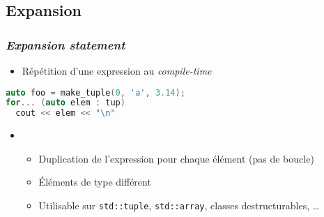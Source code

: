 \documentclass[C++.tex]{subfiles}
\begin{document}
\subsection*{Expansion}
\begin{frame}[fragile]
	\frametitle{\textit{Expansion statement}}
	\begin{itemize}
		\item Répétition d'une expression au \textit{compile-time}
	\end{itemize}

	\begin{lstlisting}[language=C++]
auto foo = make_tuple(0, 'a', 3.14);
for... (auto elem : tup)  
  cout << elem << "\n"\end{lstlisting}

	\begin{itemize}
		\item [] 
		\begin{itemize}
			\item Duplication de l'expression pour chaque élément (pas de boucle)
			\item Éléments de type différent
			\item Utilisable sur \lstinline|std::tuple|, \lstinline|std::array|, classes destructurables, \ldots{}
		\end{itemize}
	\end{itemize}
\end{frame}
\end{document}
